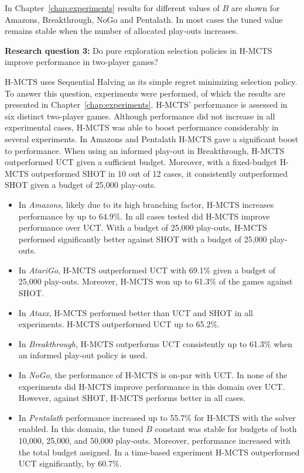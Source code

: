 \documentclass{kecsmstr}
\begin{document}
In Chapter~\ref{chap:experiments} results for different values of $B$ are shown for Amazons, Breakthrough, NoGo and Pentalath. In most cases the tuned value remains stable when the number of allocated play-outs increases.

\vspace{2mm}
\textbf{Research question 3:} Do pure exploration selection policies in H-MCTS improve performance in two-player games?
\vspace{2mm}

H-MCTS uses Sequential Halving as its simple regret minimizing selection policy. To answer this question, experiments were performed, of which the results are presented in Chapter~\ref{chap:experiments}. H-MCTS' performance is assessed in six distinct two-player games. Although performance did not increase in all experimental cases, H-MCTS was able to boost performance considerably in several experiments. In Amazons and Pentalath H-MCTS gave a significant boost to performance. When using an informed play-out in Breakthrough, H-MCTS outperformed UCT given a sufficient budget. Moreover, with a fixed-budget H-MCTS outperformed SHOT in 10 out of 12 cases, it consistently outperformed SHOT given a budget of 25,000 play-outs.

\begin{itemize}

\item In \emph{Amazons}, likely due to its high branching factor, H-MCTS increases performance by up to 64.9\%. In all cases tested did H-MCTS improve performance over UCT. With a budget of 25,000 play-outs, H-MCTS performed significantly better against SHOT with a budget of 25,000 play-outs.

\item In \emph{AtariGo}, H-MCTS outperformed UCT with 69.1\% given a budget of 25,000 play-outs. Moreover, H-MCTS won up to 61.3\% of the games against SHOT.

\item In \emph{Ataxx}, H-MCTS performed better than UCT and SHOT in all experiments. H-MCTS outperformed UCT up to 65.2\%.

\item In \emph{Breakthrough}, H-MCTS outperforms UCT consistently up to 61.3\% when an informed play-out policy is used.

\item In \emph{NoGo}, the performance of H-MCTS is on-par with UCT. In none of the experiments did H-MCTS improve performance in this domain over UCT. However, against SHOT, H-MCTS performs better in all cases.

\item In \emph{Pentalath} performance increased up to 55.7\% for H-MCTS with the solver enabled. In this domain, the tuned $B$ constant was stable for budgets of both 10,000, 25,000, and 50,000 play-outs. Moreover, performance increased with the total budget assigned. In a time-based experiment H-MCTS outperformed UCT significantly, by 60.7\%.
\end{itemize} 
\end{document}
